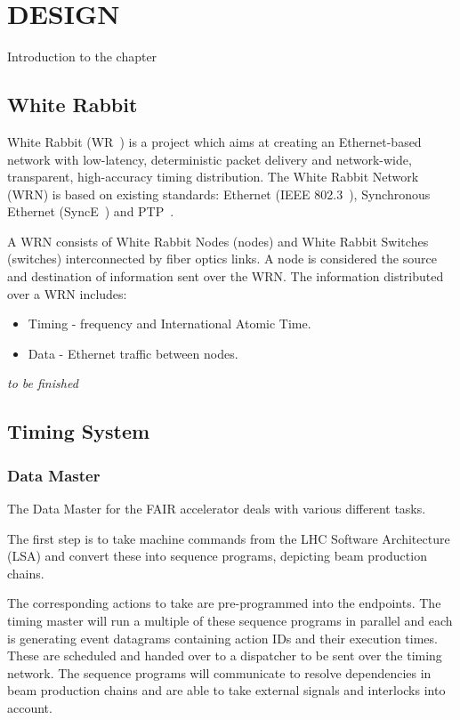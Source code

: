\section{DESIGN}

Introduction to the chapter

\subsection{White Rabbit}

White Rabbit (WR~\cite{wr}) is a project which aims at creating
an Ethernet-based network with low-latency, deterministic
packet delivery and network-wide, transparent, high-accuracy
timing distribution. The White Rabbit Network (WRN) is
based on existing standards: Ethernet (IEEE 802.3~\cite{internet}),
Synchronous Ethernet (SyncE~\cite{sync}) and PTP~\cite{ptp}. 

A WRN consists of White Rabbit Nodes (nodes) and White
Rabbit Switches (switches) interconnected by fiber optics links. 
A node is considered the source and destination of information sent 
over the WRN. The information distributed over a WRN includes:

\begin{itemize}
    \item Timing - frequency and International Atomic Time.
    \item Data - Ethernet traffic between nodes.
\end{itemize}

\textit{to be finished}

\subsection{Timing System}

\subsubsection{Data Master}

The Data Master for the FAIR accelerator deals with various different tasks.

The first step is to take machine commands from the LHC Software
Architecture (LSA) and convert these into sequence programs,
depicting beam production chains.

The corresponding actions to take are pre-programmed into the endpoints.
The timing master will run a multiple of these sequence programs
in parallel and each is generating event datagrams containing action IDs
and their execution times. These are scheduled and handed over to a dispatcher
to be sent over the timing network. The sequence programs will communicate to
resolve dependencies in beam production chains and are able to take external
signals and interlocks into account.

